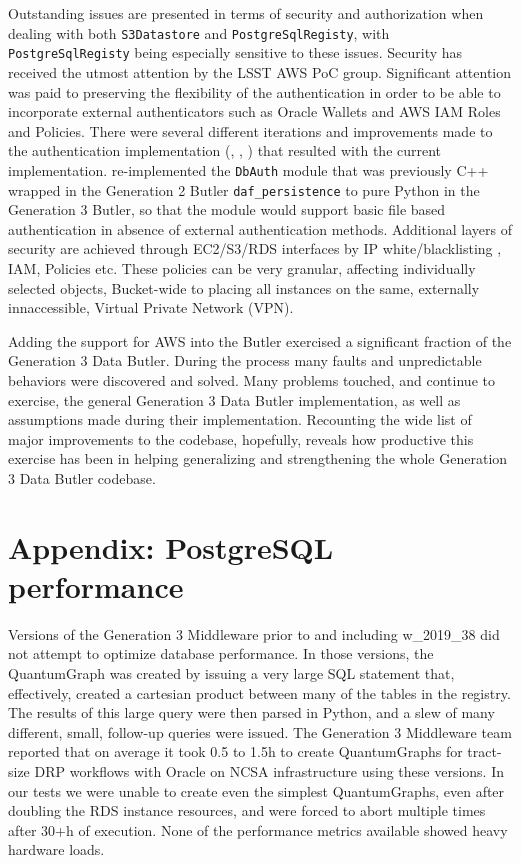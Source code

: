 Outstanding issues are presented in terms of security and authorization when dealing with both \texttt{S3Datastore} and \texttt{PostgreSqlRegisty}, with \texttt{PostgreSqlRegisty} being especially sensitive to these issues.
Security has received the utmost attention by the LSST AWS PoC group.
Significant attention was paid to preserving the flexibility of the authentication in order to be able to incorporate external authenticators such as Oracle Wallets and AWS IAM Roles and Policies.
There were several different iterations and improvements made to the authentication implementation (, , ) that resulted with the current implementation.
 re-implemented the \texttt{DbAuth} module that was previously C++ wrapped in the Generation 2 Butler \texttt{daf\_persistence} to pure Python in the Generation 3 Butler, so that the module would support basic file based authentication in absence of external authentication methods.
Additional layers of security are achieved through EC2/S3/RDS interfaces by IP white/blacklisting , IAM, Policies etc.
These policies can be very granular, affecting individually selected objects, Bucket-wide to placing all instances on the same, externally innaccessible, Virtual Private Network (VPN).

Adding the support for AWS into the Butler exercised a significant fraction of the Generation 3 Data Butler.
During the process many faults and unpredictable behaviors were discovered and solved.
Many problems touched, and continue to exercise, the general Generation 3 Data Butler implementation, as well as assumptions made during their implementation.
Recounting the wide list of major improvements to the codebase, hopefully, reveals how productive this exercise has been in helping generalizing and strengthening the whole Generation 3 Data Butler codebase.

\section{Appendix: PostgreSQL performance}

Versions of the Generation 3 Middleware prior to and including w\_2019\_38 did not attempt to optimize database performance.
In those versions, the QuantumGraph was created by issuing a very large SQL statement that, effectively, created a cartesian product between many of the tables in the registry.
The results of this large query were then parsed in Python, and a slew of many different, small, follow-up queries were issued.
The Generation 3 Middleware team reported that on average it took 0.5 to 1.5h to create QuantumGraphs for tract-size DRP workflows with Oracle on NCSA infrastructure using these versions.
In our tests we were unable to create even the simplest QuantumGraphs, even after doubling the RDS instance resources, and were forced to abort multiple times after 30+h of execution.
None of the performance metrics available showed heavy hardware loads.


